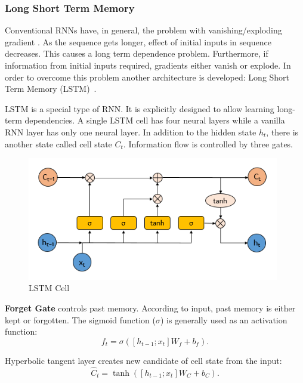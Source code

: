 \subsubsection{Long Short Term Memory}

Conventional RNNs have, in general, the problem with vanishing/exploding gradient \cite{olah_understanding_2015}. 
As the sequence gets longer, effect of initial inputs in sequence decreases. 
This causes a long term dependence problem. Furthermore, if information from initial inputs required, gradients either vanish or explode. 
In order to overcome this problem another architecture is developed: Long Short Term Memory (LSTM)~\cite{hochreiter_long_1997}. 

LSTM is a special type of RNN. 
It is explicitly designed to allow learning long-term dependencies. 
A single LSTM cell has four neural layers while a vanilla RNN layer has only one neural layer. 
In addition to the hidden state $h_t$, there is another state called cell state $C_t$. 
Information flow is controlled by three gates. 

\begin{figure}
	\centering
	\includegraphics[width=0.98\textwidth]{figures/ml_theory/lstm_cell.png}
	\caption{LSTM Cell~\cite{olah_understanding_2015}}
	\label{fig:lstm_cell}
\end{figure}

\textbf{Forget Gate} controls past memory. 
According to input, past memory is either kept or forgotten. 
The sigmoid function ($\sigma$) is generally used as an activation function: 
\begin{equation}
\label{eqn:lstm_forget}
f_t = \sigma( [h_{t-1}; x_t] W_f + b_f).
\end{equation}

Hyperbolic tangent layer creates new candidate of cell state from the input:  
\begin{equation}
\label{eqn:lstm_cellstcand}
\hat{C}_t = \tanh( [h_{t-1}; x_t] W_C + b_C).
\end{equation}

